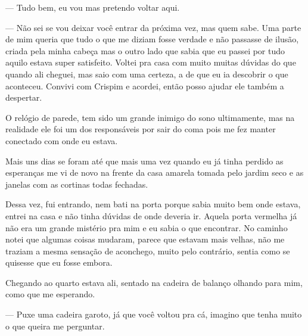 — Tudo bem, eu vou mas pretendo voltar aqui.

— Não sei se vou deixar você entrar da próxima vez, mas quem sabe.
Uma parte de mim queria que tudo o que me diziam fosse verdade e não passasse de ilusão, criada pela minha cabeça mas o outro lado que sabia que eu passei por tudo aquilo estava super satisfeito. Voltei pra casa com muito muitas dúvidas do que quando ali cheguei, mas saio com uma certeza, a de que eu ia descobrir o que aconteceu. Convivi com Crispim e acordei, então posso ajudar ele também a despertar.

O relógio de parede, tem sido um grande inimigo do sono ultimamente, mas na realidade ele foi um dos responsáveis por sair do coma pois me fez manter conectado com onde eu estava.

Mais uns dias se foram até que mais uma vez quando eu já tinha perdido as esperanças me vi de novo na frente da casa amarela tomada pelo jardim seco e as janelas com as cortinas todas fechadas.

Dessa vez, fui entrando, nem bati na porta porque sabia muito bem onde estava, entrei na casa e não tinha dúvidas de onde deveria ir. Aquela porta vermelha já não era um grande mistério pra mim e eu sabia o que encontrar. No caminho notei que algumas coisas mudaram, parece que estavam mais velhas, não me traziam a mesma sensação de aconchego, muito pelo contrário, sentia como se quisesse que eu fosse embora. 

Chegando ao quarto estava ali, sentado na cadeira de balanço olhando para mim, como que me esperando.

— Puxe uma cadeira garoto, já que você voltou pra cá, imagino que tenha muito o que queira me perguntar.